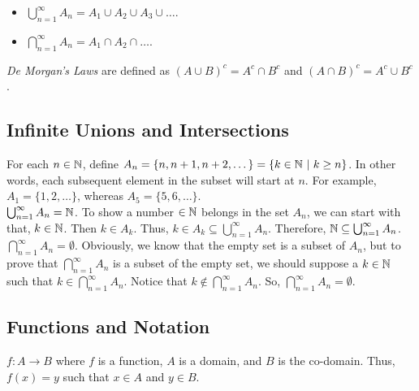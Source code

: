 \begin{itemize}
    \item \(\displaystyle \bigcup^\infty_{n=1} A_n = A_1 \cup A_2 \cup A_3 \cup \dots\). \\

    \item \(\displaystyle \bigcap^\infty_{n=1} A_n = A_1 \cap A_2 \cap \dots\). \\
\end{itemize}

\begin{definition}
    \textit{De Morgan's Laws} are defined as \((A \cup B)^c = A^c \cap B^c\) and \((A \cap B)^c = A^c \cup B^c\).
\end{definition}


\subsection{Infinite Unions and Intersections} \hfill

For each \(n \in \mathbb{N}\), define \(A_n = \{n, n+1, n+2,\dots\} = \{k \in \mathbb{N} \ | \ k \geq n\}\). In other words, each subsequent element in the subset will start at \(n\). For example, \(A_1 = \{1,2,\dots\}\), whereas \(A_5 = \{5,6,\dots\}.\)   \\

\(\bigcup^\infty_{n=1} A_n = \mathbb{N}\). To show a number \(\in \mathbb{N}\) belongs in the set \(A_n\), we can start with that, \(k \in \mathbb{N}\). Then \(k \in A_k\). Thus, \(k \in A_k \subseteq \bigcup^\infty_{n=1}A_n\). Therefore, \(\mathbb{N} \subseteq \bigcup^\infty_{n=1}A_n\). \\

\(\bigcap^\infty_{n=1}A_n = \emptyset\). Obviously, we know that the empty set is a subset of \(A_n\), but to prove that \(\bigcap^\infty_{n=1}A_n\) is a subset of the empty set, we should suppose a \(k \in \mathbb{N}\) such that \(k \in \bigcap^\infty_{n=1}A_n\). Notice that \(k \notin \bigcap^\infty_{n=1}A_n\). So, \(\bigcap^\infty_{n=1}A_n = \emptyset\).

\subsection{Functions and Notation} \hfill

\(f \colon A \rightarrow B\) where \(f\) is a function, \(A\) is a domain, and \(B\) is the co-domain. Thus, \(f(x) = y\) such that \(x \in A\) and \(y \in B\). \\

